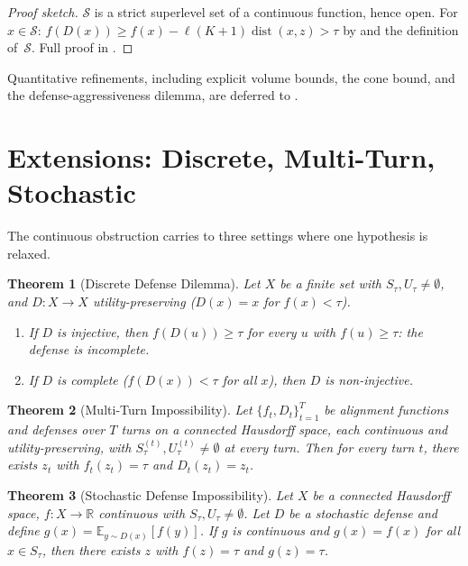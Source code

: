 \documentclass[11pt]{article}
\newtheorem{theorem}{Theorem}[section]
\newcommand{\R}{\mathbb{R}}
\newcommand{\dist}{\operatorname{dist}}
\begin{document}
\begin{proof}[Proof sketch]
$\mathcal{S}$ is a strict superlevel set of a continuous function,
hence open. For $x \in \mathcal{S}$:
$f(D(x)) \geq f(x) - \ell(K+1)\dist(x,z) > \tau$
by  and the definition of~$\mathcal{S}$.
Full proof in .
\end{proof}

Quantitative refinements, including explicit volume bounds, the cone
bound, and the defense-aggressiveness dilemma, are deferred to
.


\section{Extensions: Discrete, Multi-Turn, Stochastic}
\label{sec:extensions}
\label{sec:bridge}

The continuous obstruction carries to three settings where one
hypothesis is relaxed.

\begin{theorem}[Discrete Defense Dilemma]
\label{thm:disc-dilemma}
Let $X$ be a finite set with $S_\tau, U_\tau \neq \emptyset$, and
$D\colon X \to X$ utility-preserving ($D(x) = x$ for $f(x) < \tau$).
\begin{enumerate}[nosep]
  \item If $D$ is injective, then $f(D(u)) \geq \tau$ for every
    $u$ with $f(u) \geq \tau$: the defense is incomplete.
  \item If $D$ is complete ($f(D(x)) < \tau$ for all $x$), then $D$ is
    non-injective.
\end{enumerate}
\end{theorem}

\begin{theorem}[Multi-Turn Impossibility]
\label{thm:multi-turn}
Let $\{f_t, D_t\}_{t=1}^T$ be alignment functions and defenses over
$T$ turns on a connected Hausdorff space, each continuous and
utility-preserving, with $S_\tau^{(t)}, U_\tau^{(t)} \neq \emptyset$
at every turn. Then for every turn $t$, there exists $z_t$ with
$f_t(z_t) = \tau$ and $D_t(z_t) = z_t$.
\end{theorem}

\begin{theorem}[Stochastic Defense Impossibility]
\label{thm:stochastic}
Let $X$ be a connected Hausdorff space, $f\colon X \to \R$ continuous
with $S_\tau, U_\tau \neq \emptyset$. Let $D$ be a stochastic defense
and define $g(x) = \mathbb{E}_{y \sim D(x)}[f(y)]$. If $g$ is
continuous and $g(x) = f(x)$ for all $x \in S_\tau$, then there
exists $z$ with $f(z) = \tau$ and $g(z) = \tau$.
\end{theorem}
\end{document}
